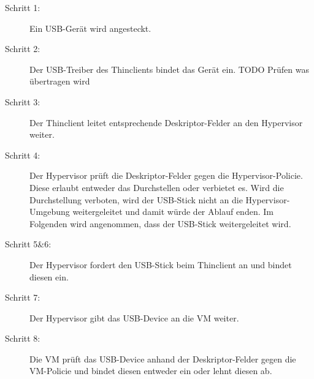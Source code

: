 \begin{description}
	\item[Schritt 1: ] Ein USB-Gerät wird angesteckt.
	\item[Schritt 2: ] Der USB-Treiber des Thinclients bindet das Gerät ein. TODO Prüfen was übertragen wird
	\item[Schritt 3: ] Der Thinclient leitet entsprechende Deskriptor-Felder an den Hypervisor weiter.
	\item[Schritt 4: ] Der Hypervisor prüft die Deskriptor-Felder gegen die Hypervisor-Policie. Diese erlaubt entweder das Durchstellen oder verbietet es. Wird die Durchstellung verboten, wird der USB-Stick nicht an die Hypervisor-Umgebung weitergeleitet und damit würde der Ablauf enden. Im Folgenden wird angenommen, dass der USB-Stick weitergeleitet wird.
	\item[Schritt 5\&6: ] Der Hypervisor fordert den USB-Stick beim Thinclient an und bindet diesen ein.
	\item[Schritt 7: ] Der Hypervisor gibt das USB-Device an die VM weiter.
	\item[Schritt 8: ] Die VM prüft das USB-Device anhand der Deskriptor-Felder gegen die VM-Policie und bindet diesen entweder ein oder lehnt diesen ab.
\end{description}